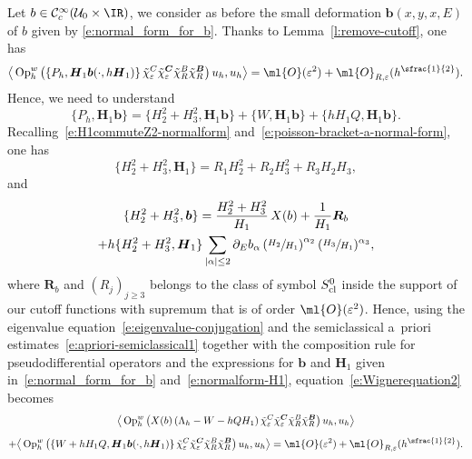 \documentclass[JEP,XML,SOM,Unicode, NoEqCountersInSection,published]{cedram}
\theoremstyle{plain}
\theoremstyle{definition}
\theoremstyle{remark}
\newcommand{\Op}{\operatorname{Op}}
\begin{document}
Let $b \in \mathcal{C}_c^\infty(\mathcal{U}_0 \times \IR)$, we consider as before the small deformation $\boldsymbol{b}(x,y,x,E)$ of $b$ given by \eqref{e:normal_form_for_b}. Thanks to Lemma~\ref{l:remove-cutoff}, one has
\begin{equation}\label{e:Wignerequation2}
\big \langle\Op_h^w\left(\left\{P_{h},\boldsymbol{H}_1 \boldsymbol{b}(\cdot,h \boldsymbol{H}_1)\right\}\tilde{\chi}_\varepsilon^C\tilde{\chi}_\varepsilon^{\boldsymbol{C}}\tilde{\chi}_R^B\tilde{\chi}_R^{\boldsymbol{B}}\right) u_h,u_h\big\rangle=\ml{O}(\varepsilon^2)+\ml{O}_{R,\varepsilon}(h^{\sfrac{1}{2}}).
\end{equation}
Hence, we need to understand
\begin{equation}%
\{P_h, \boldsymbol{H}_1 \boldsymbol{b} \}= \{H_2^2+H_3^2, \boldsymbol{H}_1 \boldsymbol{b}\}+\{ W , \boldsymbol{H}_1 \boldsymbol{b} \} + \{ h H_1 Q, \boldsymbol{H}_1 \boldsymbol{b} \}.
\end{equation}
Recalling~\eqref{e:H1commuteZ2-normalform} and~\eqref{e:poisson-bracket-a-normal-form}, one has
\[
\{ H_2^2+H_3^2,\boldsymbol{H}_1\}= R_1H_2^2+R_2H_3^2+R_3H_2H_3,
\]
and
\begin{multline*}
\{H_2^2+H_3^2,\boldsymbol{b}\}=\frac{H_2^2+H_3^2}{H_1}\,X(b)+\frac{1}{H_1}\boldsymbol{R}_b\\+h\{ H_2^2+H_3^2,\boldsymbol{H}_1\}\sum_{|\alpha|\leq 2}\partial_Eb_\alpha\left(\sfrac{H_2}{H_1}\right)^{\alpha_2}(\sfrac{H_3}{H_1})^{\alpha_3},
\end{multline*}
where $\boldsymbol{R}_b$ and $(R_j)_{j\geq 3}$ belongs to the class of symbol $S^0_{\textup{cl}}$ inside the support of our cutoff functions with supremum that is of order $\ml{O}(\varepsilon^2)$. Hence, using the eigenvalue equation~\eqref{e:eigenvalue-conjugation} and the semiclassical a~priori estimates~\eqref{e:apriori-semiclassical1} together with the composition rule for pseudodifferential operators and the expressions for $\boldsymbol{b}$ and $\boldsymbol{H}_1$ given in~\eqref{e:normal_form_for_b} and~\eqref{e:normalform-H1}, equation~\eqref{e:Wignerequation2} becomes
\begin{multline}\label{e:Wignerequation2bis}
\big \langle\Op_h^w\left(X(b)\left(\Lambda_h-W-hQH_1\right)\tilde{\chi}_\varepsilon^C\tilde{\chi}_\varepsilon^{\boldsymbol{C}}\tilde{\chi}_R^B\tilde{\chi}_R^{\boldsymbol{B}}\right) u_h,u_h\big\rangle\\[0.2cm] +
\big \langle\Op_h^w\left(\left\{W+hH_1Q,\boldsymbol{H}_1 \boldsymbol{b}(\cdot,h \boldsymbol{H}_1)\right\}\tilde{\chi}_\varepsilon^C\tilde{\chi}_\varepsilon^{\boldsymbol{C}}\tilde{\chi}_R^B\tilde{\chi}_R^{\boldsymbol{B}}\right) u_h,u_h\big\rangle=\ml{O}(\varepsilon^2)+\ml{O}_{R,\varepsilon}(h^{\sfrac{1}{2}}).
\end{multline}
\end{document}
